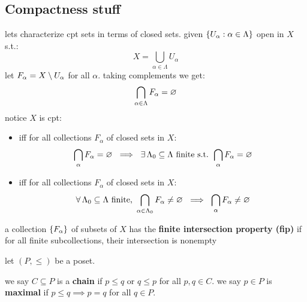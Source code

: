 \subsection{Compactness stuff}


lets characterize cpt sets in terms of closed sets.
given $\left\{{U_{\alpha}:\alpha\in\Lambda}\right\}$ open in $X$ s.t.:
\begin{equation*}
    X=\bigcup_{\alpha\in\Lambda}U_{\alpha}
\end{equation*}
let $F_{\alpha}=X\setminus U_{\alpha}$ for all $\alpha$.
taking complements we get:
\begin{equation*}
    \bigcap_{\alpha\in\Lambda}F_{\alpha}=\varnothing
\end{equation*}
notice $X$ is cpt:
\begin{itemize}
    \item iff for all collections $F_{\alpha}$ of closed sets in $X$:
        \begin{equation*}
            \bigcap_{\alpha}F_{\alpha}=\varnothing \ \implies \ \exists \,
            \Lambda_{0}\subseteq\Lambda \textrm{ finite s.t. }
            \bigcap_{\alpha}F_{\alpha}=\varnothing
        \end{equation*}
    \item iff for all collections $F_{\alpha}$ of closed sets in $X$:
        \begin{equation*}
            \forall \, \Lambda_{0}\subseteq\Lambda \textrm{ finite, }
            \bigcap_{\alpha\in\Lambda_{0}}F_{\alpha}\neq\varnothing \ \implies \
            \bigcap_{\alpha}F_{\alpha}\neq\varnothing
        \end{equation*}
\end{itemize}

\begin{defn}
    a collection $\left\{{F_{\alpha}}\right\}$ of subsets of $X$ has the
    \textbf{finite intersection property (fip)} if for all finite subcollections,
    their intersection is nonempty
\end{defn}

\newpage
{}

\begin{defn}
    let $(P,\leq)$ be a poset.

    we say $C\subseteq P$ is a \textbf{chain} if $p\leq q$ or $q\leq p$ for all
    $p,q\in C$.
    we say $p\in P$ is \textbf{maximal} if $p\leq q\implies p=q$ for all
    $q\in P$.
\end{defn} \

